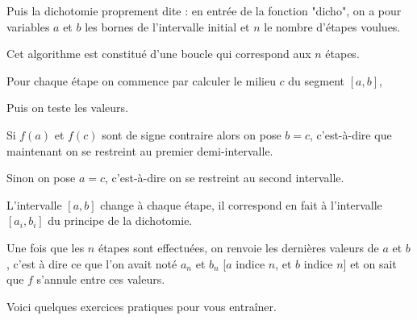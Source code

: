 Puis la dichotomie proprement dite : en entrée de la fonction "dicho", on a 
pour variables $a$ et $b$ les bornes de l'intervalle initial et $n$ le nombre d'étapes voulues.

Cet algorithme est constitué d'une boucle qui correspond aux $n$ étapes.

Pour chaque étape on commence par calculer le milieu $c$ du segment $[a,b]$,

Puis on teste les valeurs. 

Si $f(a)$ et $f(c)$ sont de signe contraire alors on pose $b=c$, c'est-à-dire
que maintenant on se restreint au premier demi-intervalle.

Sinon on pose $a=c$, c'est-à-dire on se restreint au second intervalle.

L'intervalle $[a,b]$ change à chaque étape, il correspond en fait 
à l'intervalle $[a_i,b_i]$ du principe de la dichotomie.


Une fois que les $n$ étapes sont effectuées, on renvoie les dernières valeurs de $a$ et $b$,
c'est à dire ce que l'on avait noté $a_n$ et $b_n$ [$a$ indice $n$, et $b$ indice $n$]
et on sait que $f$ s'annule entre ces valeurs. 



\diapo

Voici quelques exercices pratiques pour vous entraîner.




